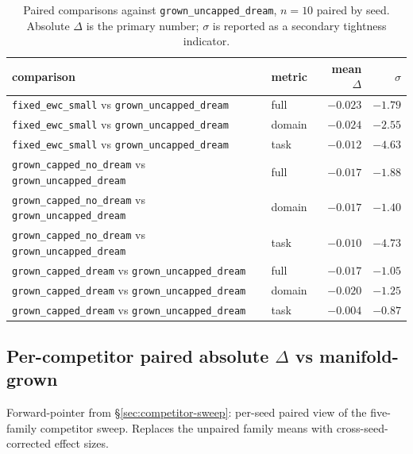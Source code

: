 \documentclass[11pt]{article}
\newcommand{\arm}[1]{\texttt{#1}}
\begin{document}
\begin{table}[h]
  \centering
  \caption{Paired comparisons against \arm{grown\_uncapped\_dream},
           $n = 10$ paired by seed. Absolute $\Delta$ is the primary
           number; $\sigma$ is reported as a secondary tightness
           indicator.}
  \label{tab:supp-trioron-paired}
  \begin{tabular}{llrr}
    \toprule
    comparison                                                                  & metric  & mean $\Delta$ & $\sigma$    \\
    \midrule
    \arm{fixed\_ewc\_small} vs \arm{grown\_uncapped\_dream}                     & full    & $-0.023$      & $-1.79$     \\
    \arm{fixed\_ewc\_small} vs \arm{grown\_uncapped\_dream}                     & domain  & $-0.024$      & $-2.55$     \\
    \arm{fixed\_ewc\_small} vs \arm{grown\_uncapped\_dream}                     & task    & $-0.012$      & $-4.63$     \\
    \arm{grown\_capped\_no\_dream} vs \arm{grown\_uncapped\_dream}              & full    & $-0.017$      & $-1.88$     \\
    \arm{grown\_capped\_no\_dream} vs \arm{grown\_uncapped\_dream}              & domain  & $-0.017$      & $-1.40$     \\
    \arm{grown\_capped\_no\_dream} vs \arm{grown\_uncapped\_dream}              & task    & $-0.010$      & $-4.73$     \\
    \arm{grown\_capped\_dream} vs \arm{grown\_uncapped\_dream}                  & full    & $-0.017$      & $-1.05$     \\
    \arm{grown\_capped\_dream} vs \arm{grown\_uncapped\_dream}                  & domain  & $-0.020$      & $-1.25$     \\
    \arm{grown\_capped\_dream} vs \arm{grown\_uncapped\_dream}                  & task    & $-0.004$      & $-0.87$     \\
    \bottomrule
  \end{tabular}
\end{table}

\subsection{Per-competitor paired absolute $\Delta$ vs manifold-grown}
\label{app:supp-paired-sigma}

Forward-pointer from \S\ref{sec:competitor-sweep}: per-seed paired
view of the five-family competitor sweep. Replaces the unpaired
family means with cross-seed-corrected effect sizes.
\end{document}
